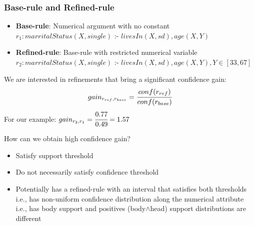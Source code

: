 \documentclass{beamer}
\begin{document}
\begin{frame}
\frametitle{Base-rule and Refined-rule}
  \begin{itemize}
   \item \textbf{Base-rule}: Numerical argument with no constant \\
      $r_1: marritalStatus(X,single)$ :- $livesIn(X,sd),age(X,Y)$ \\ 
      \quad \quad [conf=0.49,supp=2368]
   \item \textbf{Refined-rule}: Base-rule with restricted numerical variable \\  
      $r_2: marritalStatus(X,single)$ :- $livesIn(X,sd),age(X,Y),Y\in[33,67]$ \\ 
      \quad \quad [conf=0.77,supp=1092]
  \end{itemize}
 We are interested in refinements that bring a significant confidence gain:
 \begin{equation}
  gain_{r_{ref},r_{base}}=\cfrac{conf(r_{ref})}{conf(r_{base})}
 \end{equation}
 For our example:
 \begin{math}
  gain_{r_{2},r_{1}}=\cfrac{0.77}{0.49}=1.57
 \end{math}
\end{frame}
\begin{frame}
 How can we obtain high confidence gain?
 \begin{itemize}
  \item Satisfy support threshold
  \item Do not necessarily satisfy confidence threshold
  \item Potentially has a refined-rule with an interval that satisfies both thresholds \\
    \quad i.e., has non-uniform confidence distribution along the numerical attribute\\
    \quad i.e., has body support and positives (body$\wedge$head) support distributions are different
 \end{itemize}
\end{frame}
\end{document}
